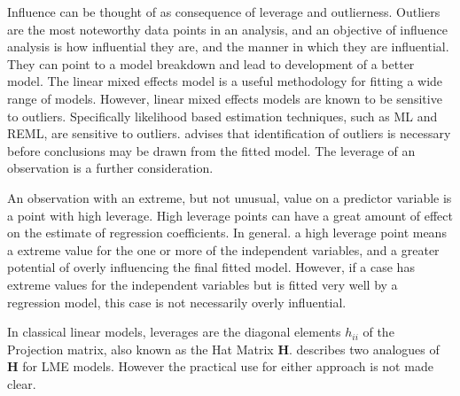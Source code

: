 \documentclass[12pt, a4paper]{report}
\theoremstyle{plain}
\theoremstyle{definition}
\theoremstyle{remark}
\begin{document}
	
	
	Influence can be thought of as consequence of leverage and outlierness. Outliers are the most noteworthy data points in an analysis, and an objective of influence analysis is how influential they are, and the manner in which they are influential. They can point to a model breakdown and lead to development of a better model.
	The linear mixed effects model is a useful methodology for fitting a wide range of models. However, linear mixed effects models are known to be sensitive to outliers. Specifically likelihood based estimation techniques, such as ML and REML, are sensitive to outliers. \citet{Christensen} advises that identification of outliers is necessary before conclusions may be drawn from the fitted model. The leverage of an observation is a further consideration. 
	
	
	An observation with an extreme, but not unusual, value on a predictor variable is a point with high leverage. High leverage points can have a great amount of effect on the estimate of regression coefficients. In general. a high leverage point means a extreme value for the one or more of the independent variables, and a greater potential of overly influencing the final fitted model. However, if a case has  extreme values for the independent variables but is fitted very well by a regression model, this case is not necessarily overly influential.
	
	In classical linear models, leverages are the diagonal elements $h_{ii}$ of the Projection matrix, also known as the Hat Matrix $\boldsymbol{H}$. \citet{schabenberger} describes two analogues of $\boldsymbol{H}$ for LME models. However the practical use for either approach is not made clear.
	
	
	
	
	
\end{document}
